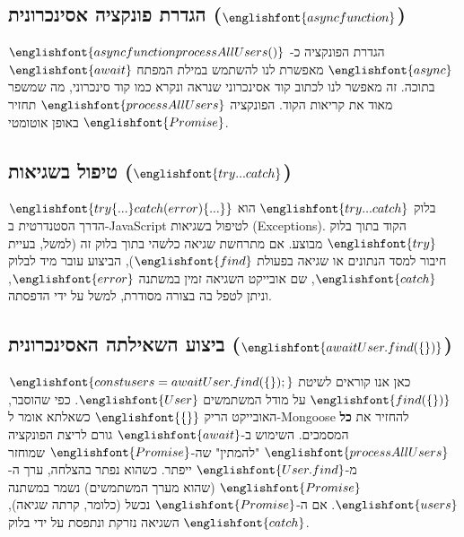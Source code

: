 \documentclass[12pt]{article}
\begin{document}
\subsection{הגדרת פונקציה אסינכרונית (\(\englishfont{async function}\))}
\begin{codeExplanationBox}{\(\englishfont{async function processAllUsers()}\)}
  הגדרת הפונקציה כ-\(\englishfont{async}\) מאפשרת לנו להשתמש במילת המפתח \(\englishfont{await}\) בתוכה. זה מאפשר לנו לכתוב קוד אסינכרוני שנראה ונקרא כמו קוד סינכרוני, מה שמשפר מאוד את קריאות הקוד. הפונקציה \(\englishfont{processAllUsers}\) תחזיר \(\englishfont{Promise}\) באופן אוטומטי.
\end{codeExplanationBox}

\subsection{טיפול בשגיאות (\(\englishfont{try...catch}\))}
\begin{codeExplanationBox}{\(\englishfont{try \{ ... \} catch (error) \{ ... \}}\)}
  בלוק \(\englishfont{try...catch}\) הוא הדרך הסטנדרטית ב-JavaScript לטיפול בשגיאות (Exceptions). הקוד בתוך בלוק \(\englishfont{try}\) מבוצע. אם מתרחשת שגיאה כלשהי בתוך בלוק זה (למשל, בעיית חיבור למסד הנתונים או שגיאה בפעולת \(\englishfont{find}\)), הביצוע עובר מיד לבלוק \(\englishfont{catch}\), שם אובייקט השגיאה זמין במשתנה \(\englishfont{error}\), וניתן לטפל בה בצורה מסודרת, למשל על ידי הדפסתה.
\end{codeExplanationBox}

\subsection{ביצוע השאילתה האסינכרונית (\(\englishfont{await User.find(\{\})}\))}
\begin{codeExplanationBox}{\(\englishfont{const users = await User.find(\{\});}\)}
  כאן אנו קוראים לשיטת \(\englishfont{find(\{\})}\) על מודל המשתמשים \(\englishfont{User}\). כפי שהוסבר, האובייקט הריק \(\englishfont{\{\}}\) כשאלתא אומר ל-Mongoose להחזיר את \textbf{כל} המסמכים. השימוש ב-\(\englishfont{await}\) גורם לריצת הפונקציה \(\englishfont{processAllUsers}\) "להמתין" שה-\(\englishfont{Promise}\) שמוחזר מ-\(\englishfont{User.find}\) ייפתר. כשהוא נפתר בהצלחה, ערך ה-\(\englishfont{Promise}\) (שהוא מערך המשתמשים) נשמר במשתנה \(\englishfont{users}\). אם ה-\(\englishfont{Promise}\) נכשל (כלומר, קרתה שגיאה), השגיאה נזרקת ונתפסת על ידי בלוק \(\englishfont{catch}\).
\end{codeExplanationBox}
\end{document}
